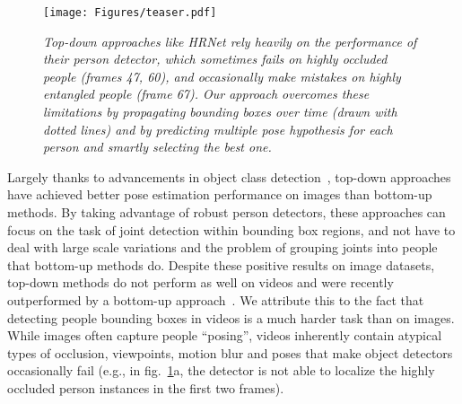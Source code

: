 \documentclass[10pt,twocolumn,letterpaper]{article}
\begin{document}
\begin{figure}
        \texttt{[image: Figures/teaser.pdf]}
        \vspace{-5mm}
    \caption{\small \it Top-down approaches like HRNet rely heavily on the performance of their person detector, which sometimes fails on highly occluded people (frames 47, 60), and occasionally make mistakes on highly entangled people (frame 67). Our approach overcomes these limitations by propagating bounding boxes over time (drawn with dotted lines) and by predicting multiple pose hypothesis for each person and smartly selecting the best one. \vspace{-5mm}}
    \label{fig:teaser}
\end{figure}

Largely thanks to advancements in object class detection~\cite{he2017mask,dai17iccv,singh18nips}, top-down approaches~\cite{sun2019deep} have achieved better pose estimation performance on images than bottom-up methods. By taking advantage of robust person detectors, these approaches can focus on the task of joint detection within bounding box regions, and not have to deal with large scale variations and the problem of grouping joints into people that bottom-up methods do. Despite these positive results on image datasets, top-down methods do not perform as well on videos and were recently outperformed by a bottom-up approach~\cite{raaj2019efficient}. 
We attribute this to the fact that detecting people bounding boxes in videos is a much harder task than on images. While images often capture people ``posing'', videos inherently contain atypical types of occlusion, viewpoints, motion blur and poses that make object detectors occasionally fail (e.g., in fig.~\ref{fig:teaser}{\color{red}a}, the detector is not able to localize the highly occluded person instances in the first two frames).
\end{document}
